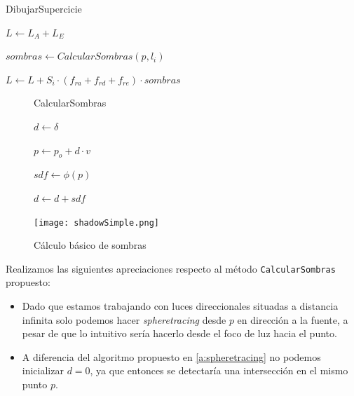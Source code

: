 \begin{algorithm}[H]
        \caption{DibujarSupercicie}
            $L \gets L_A + L_E$ 
             {

                
                $sombras \gets CalcularSombras(p, l_i)$

                $L \gets L + S_i\cdot (f_{ra} + f_{rd} + f_{re})\cdot sombras$
            }

    \end{algorithm}
\begin{figure}[ht!]
    \centering
    \begin{minipage}{0.50\textwidth}
   \begin{algorithm}[H]
            \caption{CalcularSombras}
                 $d \gets \delta$ 
                
                 {
                    $p \gets p_o + d \cdot v$
                    
                    $sdf \gets \phi(p)$
                    
            
                    $d \gets d + sdf$

                }

        \end{algorithm}
    \end{minipage}%
    \hfill
    \begin{minipage}{0.48\textwidth}
        \texttt{[image: shadowSimple.png]}
    \end{minipage}
    \caption{Cálculo básico de sombras}
    \label{fig:sombras1}
\end{figure}


Realizamos las siguientes apreciaciones respecto al método \texttt{CalcularSombras} propuesto:
\begin{itemize}
    \item Dado que estamos trabajando con luces direccionales situadas a distancia infinita solo podemos hacer \textit{spheretracing} desde $p$ en dirección a la fuente, a pesar de que lo intuitivo sería hacerlo desde el foco de luz hacia el punto.
    \item A diferencia del algoritmo propuesto en \autoref{a:spheretracing} no podemos inicializar $d=0$, ya que entonces se detectaría una intersección en el mismo punto $p$.
\end{itemize}

